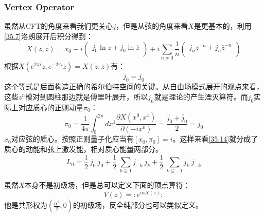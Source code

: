 \subsubsection{Vertex Operator}
虽然从CFT的角度来看我们更关心$j$，但是从弦的角度来看$X$是更基本的，利用\ref{35.7}洛朗展开后积分得到：
\begin{equation}\label{35.16}
	\left.X(z,\overline{z})=x_0-i\left(\begin{array}{c}j_0\ln z+\overline{j}_0\ln\overline{z}\\\end{array}\right.\right)+i\sum_{n\neq0}\frac1n\left(\begin{array}{c}j_nz^{-n}+\overline{j}_n\overline{z}^{-n}\\\end{array}\right)
\end{equation}
根据$X(e^{2\pi i}z,e^{-2\pi i}\bar z)=X(z,\bar z)$有：
\begin{equation}\label{35.17}
	\boxed{
		j_0=\bar j_0
	}
\end{equation}
这个等式是后面构造正确的希尔伯特空间的关键。从自由场模式展开的观点来看，这些$z^n$模对到圆柱那边就是傅里叶展开，所以$j_n$就是理论的产生湮灭算符。而$j_0$实际上对应质心的正则动量$\pi_0$：
\begin{equation}
	\pi_0=\frac1{4\pi}\int_0^{2\pi}dx^1\frac{\partial X{\left(x^0,x^1\right)}}{\partial{\left(-ix^0\right)}}=\frac{j_0+\overline{j}_0}2=j_0
\end{equation}
$x_0$对应弦的质心。按照正则量子化应当有$[x_0,\pi_0]=i$。这样来看\ref{35.14}就分成了质心的动能和弦上激发能，相对质心能量两部分。
\begin{equation}
	L_0=\frac12~j_0~j_0+\frac12~\sum_{k\geq1}j_{-k}~j_k+\frac12~\sum_{k\leq-1}j_k~j_{-k}
\end{equation}
\begin{definition}
	虽然$X$本身不是初级场，但是总可以定义下面的顶点算符：
	\begin{equation}
		\boxed{
			V(z)=:e^{i\alpha X(z)}:
		}
	\end{equation}
	他是共形权为$\left(\frac{\alpha^2}{2},0\right)$的初级场，反全纯部分也可以类似定义。
\end{definition}
